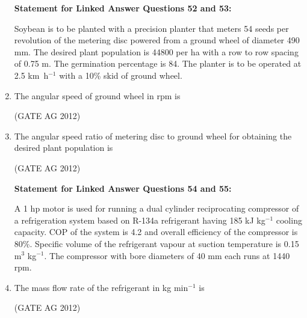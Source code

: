 \documentclass[journal]{IEEEtran}
\begin{document}
\begin{enumerate}
\textbf{Statement for Linked Answer Questions 52 and 53:}

Soybean is to be planted with a precision planter that meters 54 seeds per revolution of the metering disc powered from a ground wheel of diameter 490 mm. The desired plant population is 44800 per ha with a row to row spacing of 0.75 m. The germination percentage is 84. The planter is to be operated at 2.5 km~h$^{-1}$ with a 10\% skid of ground wheel.

\item
 The angular speed of ground wheel in rpm is
\begin{enumerate}
\end{enumerate}
\hfill(GATE AG 2012)\\

\medskip

\item
 The angular speed ratio of metering disc to ground wheel for obtaining the desired plant population is
\begin{enumerate}
\end{enumerate}
\hfill(GATE AG 2012)\\

\medskip

\textbf{Statement for Linked Answer Questions 54 and 55:}

A 1 hp motor is used for running a dual cylinder reciprocating compressor of a refrigeration system based on R-134a refrigerant having 185 kJ kg$^{-1}$ cooling capacity. COP of the system is 4.2 and overall efficiency of the compressor is 80\%. Specific volume of the refrigerant vapour at suction temperature is 0.15 m$^3$ kg$^{-1}$. The compressor with bore diameters of 40 mm each runs at 1440 rpm.

\item
 The mass flow rate of the refrigerant in kg min$^{-1}$ is
\begin{enumerate}
\end{enumerate}
\hfill(GATE AG 2012)\\


\end{enumerate}
\end{document}
